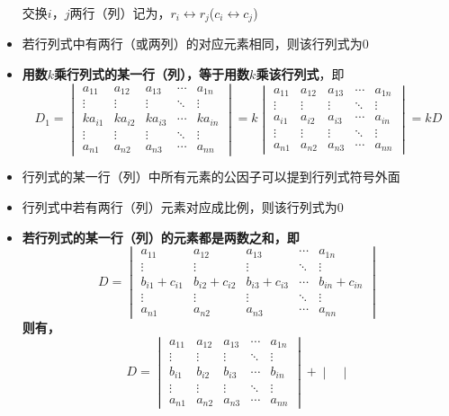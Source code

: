 \documentclass[UTF8]{ctexart}
\begin{document}
\begin{itemize}
  交换$i$，$j$两行（列）记为，$r_i\leftrightarrow r_j$($c_i\leftrightarrow c_j$)
  \item 若行列式中有两行（或两列）的对应元素相同，则该行列式为$0$
  \item \textbf{用数$k$乘行列式的某一行（列），等于用数$k$乘该行列式}，即
  \[D_1=\begin{vmatrix}
  a_{11}&a_{12}&a_{13}&\cdots&a_{1n}\\
  \vdots&\vdots&\vdots&\ddots&\vdots\\
  ka_{i1}&ka_{i2}&ka_{i3}&\cdots&ka_{in}\\
  \vdots&\vdots&\vdots&\ddots&\vdots\\
  a_{n1}&a_{n2}&a_{n3}&\cdots&a_{nn}
  \end{vmatrix}
  =k\begin{vmatrix}
  a_{11}&a_{12}&a_{13}&\cdots&a_{1n}\\
  \vdots&\vdots&\vdots&\ddots&\vdots\\
  a_{i1}&a_{i2}&a_{i3}&\cdots&a_{in}\\
  \vdots&\vdots&\vdots&\ddots&\vdots\\
  a_{n1}&a_{n2}&a_{n3}&\cdots&a_{nn}
  \end{vmatrix}=kD
  \]
  \item 行列式的某一行（列）中所有元素的公因子可以提到行列式符号外面
  \item 行列式中若有两行（列）元素对应成比例，则该行列式为$0$
  \item \textbf{若行列式的某一行（列）的元素都是两数之和，即
  \[D=\begin{vmatrix}
  a_{11}&a_{12}&a_{13}&\cdots&a_{1n}\\
  \vdots&\vdots&\vdots&\ddots&\vdots\\
  b_{i1}+c_{i1}&b_{i2}+c_{i2}&b_{i3}+c_{i3}&\cdots&b_{in}+c_{in}\\
  \vdots&\vdots&\vdots&\ddots&\vdots\\
  a_{n1}&a_{n2}&a_{n3}&\cdots&a_{nn}
  \end{vmatrix}
  \]
  则有，
  \[D=\begin{vmatrix}
  a_{11}&a_{12}&a_{13}&\cdots&a_{1n}\\
  \vdots&\vdots&\vdots&\ddots&\vdots\\
  b_{i1}&b_{i2}&b_{i3}&\cdots&b_{in}\\
  \vdots&\vdots&\vdots&\ddots&\vdots\\
  a_{n1}&a_{n2}&a_{n3}&\cdots&a_{nn}
  \end{vmatrix}+\begin{vmatrix}

\end{vmatrix}\]}
\end{itemize}
\end{document}
